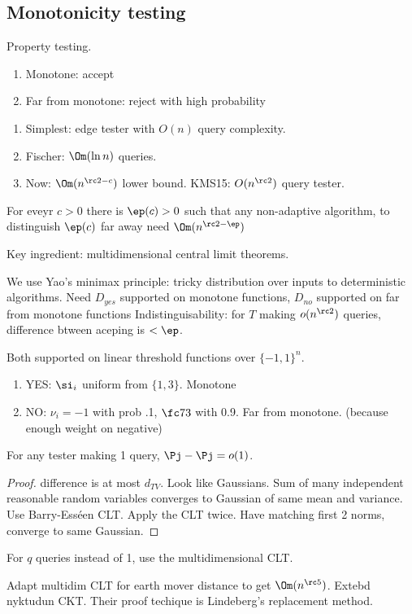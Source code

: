 \subsection{Monotonicity testing}

Property testing.
\begin{enumerate}
\item
Monotone: accept
\item
Far from monotone: reject with high probability
\end{enumerate}
\begin{enumerate}
\item
Simplest:
edge tester with $O(n)$ query complexity.
\item
Fischer: $\Om(\ln n)$ queries.
\item
Now: $\Om(n^{\rc 2-c})$ lower bound. KMS15: $O(n^{\rc 2})$ query tester.
\end{enumerate}

For eveyr $c>0$ there is $\ep(c)>0$ such that any non-adaptive algorithm, to distinguish $\ep(c)$ far away need $\Om(n^{\rc 2-\ep})$

Key ingredient: multidimensional central limit theorems. 

We use Yao's minimax principle: tricky distribution over inputs to deterministic algorithms. Need $D_{yes}$ supported on monotone functions, $D_{no}$ supported on far from monotone functions Indistinguisability: for $T$ making $o(n^{\rc 2})$ queries, difference btween aceping is $<\ep$.

Both supported on linear threshold functions over $\{-1,1\}^n$. 
\begin{enumerate}
\item
YES: $\si_i$ uniform from $\{1,3\}$. Monotone
\item
NO: $\nu_i=-1$ with prob .1, $\fc 73$ with 0.9. Far from monotone. (because enough weight on negative)
\end{enumerate}
For any tester making 1 query, $\Pj-\Pj=o(1)$. 
\begin{proof}
difference is at most $d_{TV}$. Look like Gaussians. Sum of many independent reasonable random variables converges to Gaussian of same mean and variance. Use Barry-Ess\'een CLT.
Apply the CLT twice. Have matching first 2 norms, converge to same Gaussian.
\end{proof}
For $q$ queries instead of 1, use the multidimensional CLT.

Adapt multidim CLT for earth mover distance to get $\Om(n^{\rc 5})$. Extebd nyktudun CKT. Their proof techique is Lindeberg's replacement method. 

